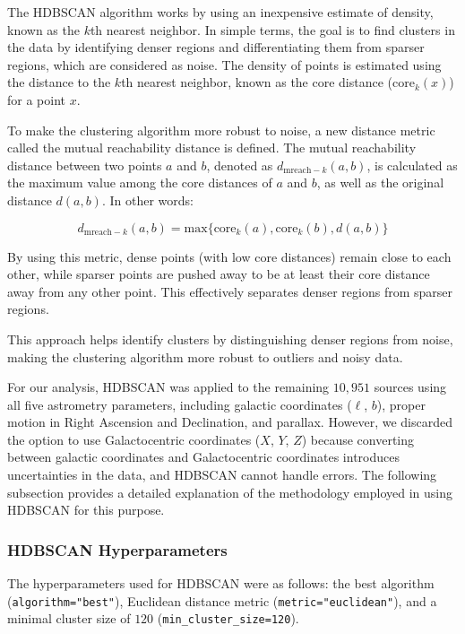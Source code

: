 \documentclass[baaa]{baaa}
\begin{document}
The HDBSCAN algorithm works by using an inexpensive estimate of density, known as the $k$th nearest neighbor. In simple terms, the goal is to find clusters in the data by identifying denser regions and differentiating them from sparser regions, which are considered as noise. The density of points is estimated using the distance to the $k$th nearest neighbor, known as the core distance ($\text{core}_k(x)$) for a point $x$.

To make the clustering algorithm more robust to noise, a new distance metric called the mutual reachability distance is defined. The mutual reachability distance between two points $a$ and $b$, denoted as $d_{\text{mreach}-k}(a, b)$, is calculated as the maximum value among the core distances of $a$ and $b$, as well as the original distance $d(a, b)$. In other words:

\begin{equation*}
d_{\text{mreach}-k}(a, b) = \text{max}\{\text{core}_k(a), \text{core}_k(b), d(a, b)\}
\end{equation*}

By using this metric, dense points (with low core distances) remain close to each other, while sparser points are pushed away to be at least their core distance away from any other point. This effectively separates denser regions from sparser regions.

This approach helps identify clusters by distinguishing denser regions from noise, making the clustering algorithm more robust to outliers and noisy data.

For our analysis, HDBSCAN was applied to the remaining $10,951$ sources using all five astrometry parameters, including galactic coordinates ($\ell$, $b$), proper motion in Right Ascension and Declination, and parallax. However, we discarded the option to use Galactocentric coordinates ($X$, $Y$, $Z$) because converting between galactic coordinates and Galactocentric coordinates introduces uncertainties in the data, and HDBSCAN cannot handle errors. The following subsection provides a detailed explanation of the methodology employed in using HDBSCAN for this purpose.

\subsubsection{HDBSCAN Hyperparameters}

The hyperparameters used for HDBSCAN were as follows: the best algorithm (\texttt{algorithm="best"}), Euclidean distance metric (\texttt{metric="euclidean"}), and a minimal cluster size of $120$ (\texttt{min\_cluster\_size=120}).
\end{document}
